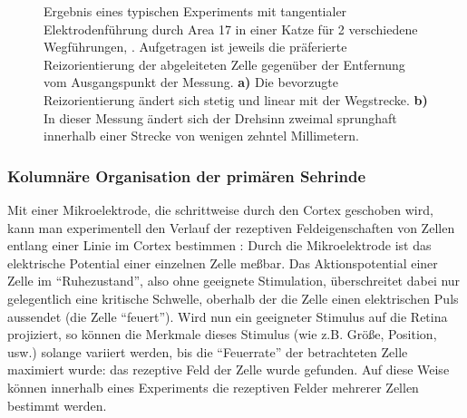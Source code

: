 \begin{figure}[p]
    \centering
    \caption{Einfaches Model der Orientierungspräferenz \cite{hubel:1962}:
    Die Axone mehrerer Zentrum--Umfeld--Zellen konvergieren auf eine einfache
    Zelle. Dadurch, daß die rezeptiven Felder der Zentrum--Umfeld--Zellen auf
    der Sinnesoberfläche entlang einer Linie angeordnet sind, antwortet die
    einfache Zelle selektiv auf Lichtbalken einer bestimmten Orientierung.}
    \label{opmodel}
    \begin{minipage}[m]{5.5cm}
    \end{minipage}
    \hskip1cm
    \begin{minipage}[m]{5.5cm}
    \end{minipage}
    \caption{Ergebnis eines typischen Experiments mit tangentialer
    Elektroden\-führ\-ung durch Area 17 in einer Katze für 2 verschiedene
    Wegführungen, \parencite[aus][]{hubel:1989}. Aufgetragen ist
    jeweils die präferierte Reizorientierung der abgeleiteten Zelle gegenüber
    der Entfernung vom Ausgangspunkt der Messung. \textbf{a)} Die bevorzugte
    Reizorientierung ändert sich stetig und linear mit der Wegstrecke.
    \textbf{b)} In dieser Messung ändert sich der Drehsinn zweimal sprunghaft
    innerhalb einer Strecke von wenigen zehntel Millimetern.}
    \label{opelektrode}
\end{figure}

\subsubsection{Kolumnäre Organisation der primären Sehrinde}

Mit einer Mikroelektrode, die schrittweise durch den Cortex geschoben wird,
kann man experimentell den Verlauf der rezeptiven Feldeigenschaften von
Zellen entlang einer Linie im Cortex bestimmen
\parencite[siehe z.B.][]{hubel:1989}: Durch die Mikroelektrode ist
das elektrische Potential einer einzelnen Zelle meßbar. Das
Aktionspotential einer Zelle im ``Ruhezustand'', also ohne geeignete
Stimulation, überschreitet dabei nur gelegentlich eine kritische Schwelle,
oberhalb der die Zelle einen elektrischen Puls aussendet (die Zelle
``feuert''). Wird nun ein geeigneter Stimulus auf die Retina projiziert,
so können die Merkmale dieses Stimulus (wie z.B. Größe, Position, usw.)
solange variiert werden, bis die ``Feuerrate'' der betrachteten Zelle
maximiert wurde: das rezeptive Feld der Zelle wurde gefunden. Auf diese
Weise können innerhalb eines Experiments die rezeptiven Felder mehrerer
Zellen bestimmt werden.

